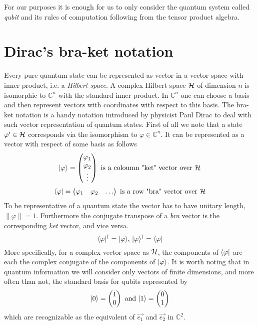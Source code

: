 	For our purposes it is enough for us to only consider the quantum system called \emph{qubit} and its rules of computation following from the tensor product algebra. 

\section{Dirac's bra-ket notation}
	Every pure quantum state can be represented as vector in a vector space with inner product, i.e. a \emph{Hilbert space}. 
	 A complex Hilbert space $\mathcal{H}$ of dimension $n$ is isomorphic to $ \mathbb{C}^n $ with the standard inner product. 
	 In $\mathbb{C}^n $ one can choose a basis and then represent vectors with coordinates with respect to this basis.
	The bra-ket notation is a handy notation introduced by physicist Paul Dirac to deal with such vector representation of quantum states. 
	First of all we note that a state $\varphi '\in\mathcal{H}$ corresponds via the isomorphism to $ \varphi  \in \mathbb{C}^n $. It can be represented as a vector with respect of some basis as follows
	$$|\varphi \rangle = \begin{pmatrix} \varphi_1 \\ \varphi_2 \\ \vdots \end{pmatrix}	  \text{  is a coloumn "ket" vector over } \mathcal{H} $$
	$$\langle \varphi|  = \begin{pmatrix} \varphi_1 & \varphi_2 & \hdots \end{pmatrix} \text{  is a row "bra" vector over } \mathcal{H} $$
	To be representative of a quantum state the vector has to have unitary length, $\|\varphi\|= 1$.
	Furthermore the conjugate transpose of a \emph{bra} vector is the corresponding \emph{ket} vector, and vice versa.
	$$ \langle \varphi|^{\dagger} = |\varphi \rangle \text{,    } |\varphi \rangle^{\dagger} = \langle \varphi|$$
	More specifically, for a complex vector space as $\mathcal{H}$, the components of $\langle \varphi|$ are each the complex conjugate of the components of $|\varphi \rangle$.
	It is worth noting that in quantum information we will consider only vectors of finite dimensions, and more often than not, the standard basis for qubits represented by
	$$|0 \rangle =  \begin{pmatrix} 1 \\ 0 \end{pmatrix}
	\text{ and }
	|1 \rangle =  \begin{pmatrix} 0 \\ 1 \end{pmatrix}$$
	which are recognizable as the equivalent of $\vec{e_1}$ and $\vec{e_2}$ in $\mathbb{C}^2$.
	
